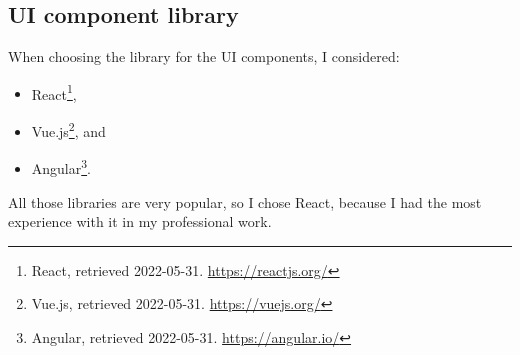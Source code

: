 \subsection{UI component library}\label{ui-component-library}

When choosing the library for the UI components, I considered:

\begin{itemize}
  \item
    React\footnote{React, retrieved 2022-05-31. \url{https://reactjs.org/}},
  \item
    Vue.js\footnote{Vue.js, retrieved 2022-05-31. \url{https://vuejs.org/}},
    and
  \item
    Angular\footnote{Angular, retrieved 2022-05-31.
    \url{https://angular.io/}}.
\end{itemize}

All those libraries are very popular, so I chose React, because I had
the most experience with it in my professional work.
